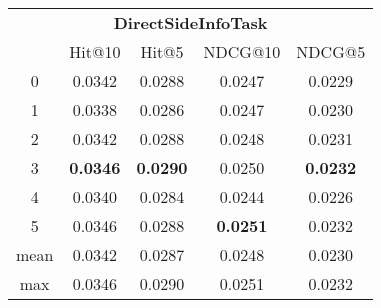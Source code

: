 \documentclass{article}
\begin{document}
 

\begin{tabular}{c|cccc}

\multicolumn{5}{c}{\textbf{DirectSideInfoTask}} \\
\noalign{\smallskip}
\noalign{\smallskip}
\toprule
\multicolumn{1}{c}{Template ID} & \multicolumn{1}{|c}{Hit@10} & \multicolumn{1}{c}{Hit@5} & \multicolumn{1}{c}{NDCG@10} & \multicolumn{1}{c}{NDCG@5} \\
\midrule
0 & 0.0342 & 0.0288 & 0.0247 & 0.0229 \\
1 & 0.0338 & 0.0286 & 0.0247 & 0.0230 \\
2 & 0.0342 & 0.0288 & 0.0248 & 0.0231 \\
3 & \textbf{0.0346} & \textbf{0.0290} & 0.0250 & \textbf{0.0232} \\
4 & 0.0340 & 0.0284 & 0.0244 & 0.0226 \\
5 & 0.0346 & 0.0288 & \textbf{0.0251} & 0.0232 \\
\midrule
mean & 0.0342 & 0.0287 & 0.0248 & 0.0230 \\
max & 0.0346 & 0.0290 & 0.0251 & 0.0232 \\
\bottomrule

\end{tabular}
\end{document}
